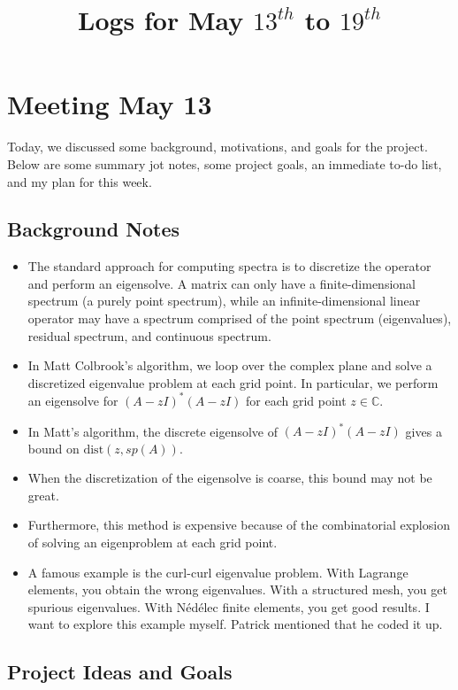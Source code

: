 \documentclass[12pt,a4paper]{article}
\title{Logs for May $13^{th}$ to $19^{th}$}
\author{}
\date{}
\begin{document}
\maketitle

\section{Meeting May 13}

Today, we discussed some background, motivations, and goals for the project. Below are some summary jot notes, some project goals, an immediate to-do list, and my plan for this week.

\subsection{Background Notes}
\begin{itemize}
    \item The standard approach for computing spectra is to discretize the operator and perform an eigensolve. A matrix can only have a finite-dimensional spectrum (a purely point spectrum), while an infinite-dimensional linear operator may have a spectrum comprised of the point spectrum (eigenvalues), residual spectrum, and continuous spectrum.  
    \item In Matt Colbrook's algorithm, we loop over the complex plane and solve a discretized eigenvalue problem at each grid point. In particular, we perform an eigensolve for $(A - zI)^*(A-zI)$ for each grid point $z \in \mathbb{C}.$
    \item In Matt's algorithm, the discrete eigensolve of $(A - zI)^*(A-zI)$ gives a bound on $\text{dist}(z, sp(A)).$
    \item When the discretization of the eigensolve is coarse, this bound may not be great. 
    \item Furthermore, this method is expensive because of the combinatorial explosion of solving an eigenproblem at each grid point. 
    \item A famous example is the curl-curl eigenvalue problem. With Lagrange elements, you obtain the wrong eigenvalues. With a structured mesh, you get spurious eigenvalues. With Nédélec finite elements, you get good results. I want to explore this example myself. Patrick mentioned that he coded it up. 
\end{itemize}


\subsection{Project Ideas and Goals}
\end{document}
